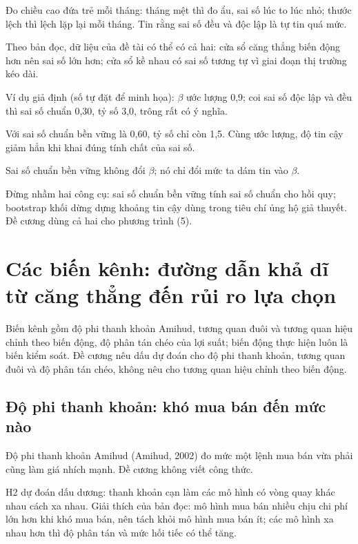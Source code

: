 Đo chiều cao đứa trẻ mỗi tháng: tháng mệt thì đo ẩu, sai số lúc to lúc nhỏ; thước lệch thì lệch lặp lại mỗi tháng. Tin rằng sai số đều và độc lập là tự tin quá mức.

Theo bản đọc, dữ liệu của đề tài có thể có cả hai: cửa sổ căng thẳng biến động hơn nên sai số lớn hơn; cửa sổ kề nhau có sai số tương tự vì giai đoạn thị trường kéo dài.

\begin{tcolorbox}[breakable]
Ví dụ giả định (số tự đặt để minh họa): \texorpdfstring{$\beta$}{beta} ước lượng 0,9; coi sai số độc lập và đều thì sai số chuẩn 0,30, tỷ số 3,0, trông rất có ý nghĩa.

Với sai số chuẩn bền vững là 0,60, tỷ số chỉ còn 1,5. Cùng ước lượng, độ tin cậy giảm hẳn khi khai đúng tính chất của sai số.

Sai số chuẩn bền vững không đổi \texorpdfstring{$\beta$}{beta}; nó chỉ đổi mức ta dám tin vào \texorpdfstring{$\beta$}{beta}.
\end{tcolorbox}

Đừng nhầm hai công cụ: sai số chuẩn bền vững tính sai số chuẩn cho hồi quy; bootstrap khối dừng dựng khoảng tin cậy dùng trong tiêu chí ủng hộ giả thuyết. Đề cương dùng cả hai cho phương trình (5).

\section{Các biến kênh: đường dẫn khả dĩ từ căng thẳng đến rủi ro lựa chọn}

Biến kênh gồm độ phi thanh khoản Amihud, tương quan đuôi và tương quan hiệu chỉnh theo biến động, độ phân tán chéo của lợi suất; biến động thực hiện luôn là biến kiểm soát. Đề cương nêu dấu dự đoán cho độ phi thanh khoản, tương quan đuôi và độ phân tán chéo, không nêu cho tương quan hiệu chỉnh theo biến động.

\subsection{Độ phi thanh khoản: khó mua bán đến mức nào}

Độ phi thanh khoản Amihud (Amihud, 2002) đo mức một lệnh mua bán vừa phải cũng làm giá nhích mạnh. Đề cương không viết công thức.

H2 dự đoán dấu dương: thanh khoản cạn làm các mô hình có vòng quay khác nhau cách xa nhau. Giải thích của bản đọc: mô hình mua bán nhiều chịu chi phí lớn hơn khi khó mua bán, nên tách khỏi mô hình mua bán ít; các mô hình xa nhau hơn thì độ phân tán và mức hối tiếc có thể tăng.

